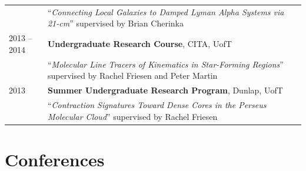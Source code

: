 \documentclass[10pt]{res} %
\begin{document}
\begin{resume}
\begin{table}[h!]
\begin{tabularx}{\textwidth}{ @{} p{6.5em} X @{} }
         & ``\textit{Connecting Local Galaxies to Damped Lyman Alpha Systems via 21-cm}'' supervised by Brian Cherinka \\
2013 -- 2014 &\textbf{Undergraduate Research Course}, CITA, UofT \\
                     & ``\textit{Molecular Line Tracers of Kinematics in Star-Forming Regions}'' supervised by Rachel Friesen and Peter Martin \\
2013 & \textbf{Summer Undergraduate Research Program}, Dunlap, UofT \\
         & ``\textit{Contraction Signatures Toward Dense Cores in the Perseus Molecular Cloud}'' supervised by Rachel Friesen
\end{tabularx}
\end{table}


\section{\Large Conferences}
\vspace{-5pt} %
\noindent\makebox[\linewidth]{\rule{\textwidth}{0.4pt}}
\vspace{-20pt} %


\end{resume}
\end{document}
